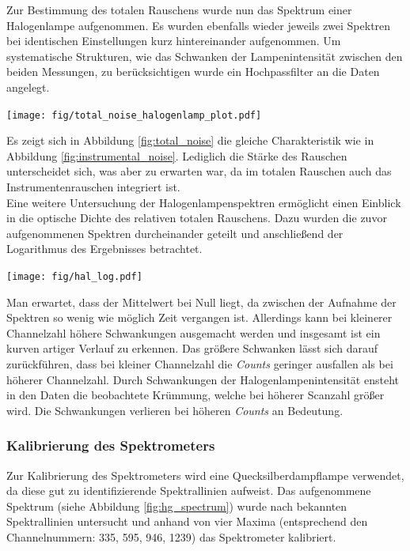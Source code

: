 \documentclass[12pt, a4paper, bibliography=totoc]{scrartcl}
\begin{document}
\begin{multicols}{2}
Zur Bestimmung des totalen Rauschens wurde nun das Spektrum einer Halogenlampe aufgenommen.
Es wurden ebenfalls wieder jeweils zwei Spektren bei identischen Einstellungen kurz hintereinander aufgenommen. 
Um systematische Strukturen, wie das Schwanken der Lampenintensität zwischen den beiden Messungen, zu berücksichtigen wurde ein Hochpassfilter an die Daten angelegt.
\begin{center}
	\texttt{[image: fig/total\_noise\_halogenlamp\_plot.pdf]}
	\label{fig:total_noise}
\end{center}  

Es zeigt sich in Abbildung \ref{fig:total_noise} die gleiche Charakteristik wie in Abbildung \ref{fig:instrumental_noise}. Lediglich die Stärke des Rauschen unterscheidet sich, was aber zu erwarten war, da im totalen Rauschen auch das Instrumentenrauschen integriert ist.
\\
Eine weitere Untersuchung der Halogenlampenspektren ermöglicht einen Einblick in die optische Dichte des relativen totalen Rauschens. Dazu wurden die zuvor aufgenommenen Spektren durcheinander geteilt und anschließend der Logarithmus des Ergebnisses betrachtet.

\begin{center}
    \texttt{[image: fig/hal\_log.pdf]}
    \label{fig:hal_log}
\end{center}

Man erwartet, dass der Mittelwert bei Null liegt, da zwischen der Aufnahme der Spektren so wenig wie möglich Zeit vergangen ist. Allerdings kann bei kleinerer Channelzahl höhere Schwankungen ausgemacht werden und insgesamt ist ein kurven artiger Verlauf zu erkennen.
Das größere Schwanken lässt sich darauf zurückführen, dass bei kleiner Channelzahl die \textit{Counts} geringer ausfallen als bei höherer Channelzahl.
Durch Schwankungen der Halogenlampenintensität ensteht in den Daten die beobachtete Krümmung, welche bei höherer Scanzahl größer wird. Die Schwankungen verlieren bei höheren \textit{Counts} an Bedeutung.

\subsubsection{Kalibrierung des Spektrometers}\label{sssec:calibrating_the_spectrometer}

Zur Kalibrierung des Spektrometers wird eine Quecksilberdampflampe verwendet, da diese gut zu identifizierende Spektrallinien aufweist.
Das aufgenommene Spektrum (siehe Abbildung \ref{fig:hg_spectrum}) wurde nach bekannten Spektrallinien untersucht und anhand von vier Maxima (entsprechend den Channelnummern: 335, 595, 946, 1239) das Spektrometer kalibriert. 



\end{multicols}
\end{document}
